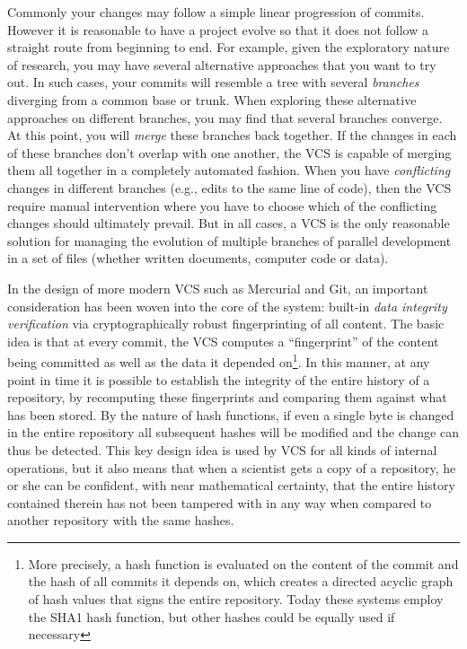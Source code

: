\documentclass[ChapterTOCs,krantz2]{krantz} %
\theoremstyle{definition}
\begin{document}
Commonly your changes may follow a simple linear progression of commits.
However it is reasonable to have a project evolve so that it does not follow a
straight route from beginning to end. For example, given the exploratory nature
of research, you may have several alternative approaches that you want to try
out. In such cases, your commits will resemble a tree with several
\emph{branches} diverging from a common base or trunk. When exploring these
alternative approaches on different branches, you may find that several
branches converge. At this point, you will \emph{merge} these
branches back together.  If the changes in each of these branches don't overlap
with one another, the VCS is capable of merging them all together in a
completely automated fashion.  When you have \emph{conflicting} changes in
different branches (e.g., edits to the same line of code), then the VCS
require manual intervention where you have to choose which of the conflicting
changes should ultimately prevail.  But in all cases, a VCS is the only
reasonable solution for managing the evolution of multiple branches of parallel
development in a set of files (whether written documents, computer code or
data).

In the design of more modern VCS such as Mercurial and Git, an important
consideration has been woven into the core of the system: built-in \emph{data
  integrity verification} via cryptographically robust fingerprinting of all
content.  The basic idea is that at every commit, the VCS computes a
``fingerprint'' of the content being committed as well as the data it depended
on\footnote{More precisely, a hash function is evaluated on the content of the
  commit and the hash of all commits it depends on, which creates a directed
  acyclic graph of hash values that signs the entire repository.  Today these
  systems employ the SHA1 hash function, but other hashes could be equally used
  if necessary}.  In this manner, at any point in time it is possible to
establish the integrity of the entire history of a repository, by recomputing
these fingerprints and comparing them against what has been stored.  By the
nature of hash functions, if even a single byte is changed in the entire
repository all subsequent hashes will be modified and the change can thus be
detected.  This key design idea is used by VCS for all kinds of internal
operations, but it also means that when a scientist gets a copy of a
repository, he or she can be confident, with near mathematical certainty, that
the entire history contained therein has not been tampered with in any way when
compared to another repository with the same hashes.  
\end{document}
